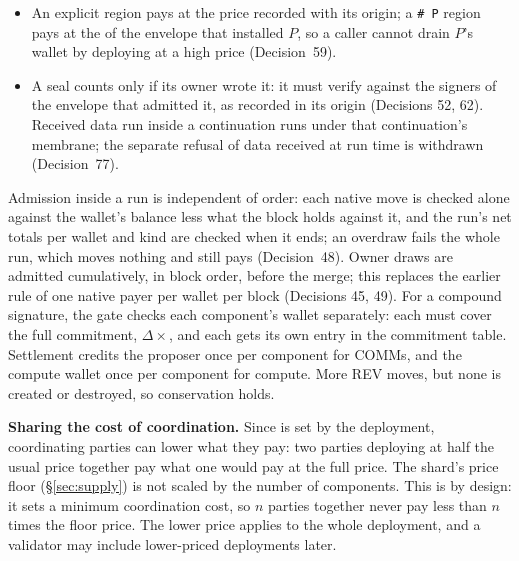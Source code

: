 \documentclass[11pt]{article}
\newcommand{\code}{\path}
\begin{document}
\begin{itemize}
\item An explicit region pays at the price recorded with its origin; a \texttt{\# P} region pays at the \code{phloPrice} of the envelope that installed $P$, so a caller cannot drain $P$'s wallet by deploying at a high price (Decision~59).
\item A seal counts only if its owner wrote it: it must verify against the signers of the envelope that admitted it, as recorded in its origin (Decisions 52, 62). Received data run inside a continuation runs under that continuation's membrane; the separate refusal of data received at run time is withdrawn (Decision~77).
\end{itemize}
Admission inside a run is independent of order: each native move is checked alone against the wallet's balance less what the block holds against it, and the run's net totals per wallet and kind are checked when it ends; an overdraw fails the whole run, which moves nothing and still pays (Decision~48). Owner draws are admitted cumulatively, in block order, before the merge; this replaces the earlier rule of one native payer per wallet per block (Decisions 45, 49).
For a compound signature, the gate checks each component's wallet separately: each must cover the full commitment, $\Delta \times {}$\code{phloPrice}, and each gets its own entry in the commitment table. Settlement credits the proposer once per component for COMMs, and the compute wallet once per component for compute. More REV moves, but none is created or destroyed, so conservation holds.

\textbf{Sharing the cost of coordination.} Since \code{phloPrice} is set by the deployment, coordinating parties can lower what they pay: two parties deploying at half the usual price together pay what one would pay at the full price. The shard's price floor (\S\ref{sec:supply}) is not scaled by the number of components. This is by design: it sets a minimum coordination cost, so $n$ parties together never pay less than $n$ times the floor price. The lower price applies to the whole deployment, and a validator may include lower-priced deployments later.
\end{document}
